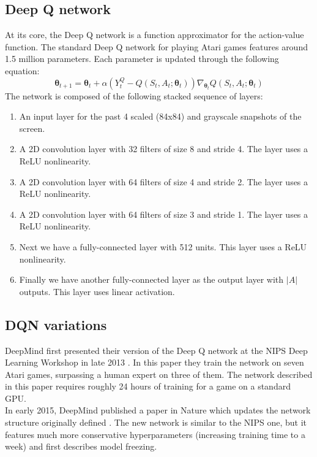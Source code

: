 \documentclass{article}
\begin{document}
\subsection{Deep Q network}
  At its core, the Deep Q network is a function approximator for the action-value function. The standard Deep Q network for playing Atari games features around 1.5 million parameters. Each parameter is updated through the following equation:
  \[ \boldsymbol{\theta}_{t+1} = \boldsymbol{\theta}_t+\alpha(Y_t^Q-Q(S_t,A_t;\boldsymbol{\theta}_t))\nabla_{\boldsymbol{\theta}_t}Q(S_t,A_t;\boldsymbol{\theta}_t) \]
  The network is composed of the following stacked sequence of layers:
  \begin{enumerate}
    \item An input layer for the past 4 scaled (84x84) and grayscale snapshots of the screen.
    \item A 2D convolution layer with 32 filters of size 8 and stride 4. The layer uses a ReLU nonlinearity.
    \item A 2D convolution layer with 64 filters of size 4 and stride 2. The layer uses a ReLU nonlinearity.
    \item A 2D convolution layer with 64 filters of size 3 and stride 1. The layer uses a ReLU nonlinearity.
    \item Next we have a fully-connected layer with 512 units. This layer uses a ReLU nonlinearity.
    \item Finally we have another fully-connected layer as the output layer with $|A|$ outputs. This layer uses linear activation.
  \end{enumerate}

\subsection{DQN variations}
DeepMind first presented their version of the Deep Q network at the NIPS Deep Learning Workshop in late 2013 \cite{dmnips}. In this paper they train the network on seven Atari games, surpassing a human expert on three of them. The network described in this paper requires roughly 24 hours of training for a game on a standard GPU.\\

In early 2015, DeepMind published a paper in Nature which updates the network structure originally defined \cite{dmnature}. The new network is similar to the NIPS one, but it features much more conservative hyperparameters (increasing training time to a week) and first describes model freezing. \\
\end{document}
